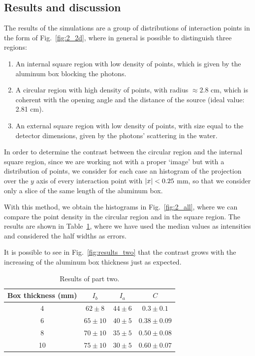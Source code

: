 \documentclass[a4paper]{article}
\begin{document}
\subsection{Results and discussion}
The results of the simulations are a group of distributions of interaction points in the form of Fig.~\ref{fig:2_2d}, where in general is possible to distinguish three regions:
\begin{enumerate}
  \item An internal square region with low density of points, which is given by the aluminum box blocking the photons.
  \item A circular region with high density of points, with radius $\approx 2.8$ cm, which is coherent with the opening angle and the distance of the source (ideal value: 2.81 cm).
  \item An external square region with low density of points, with size equal to the detector dimensions, given by the photons' scattering in the water.
\end{enumerate}
In order to determine the contrast between the circular region and the internal square region, since we are working not with a proper `image' but with a distribution of points, we consider for each case an histogram of the projection over the $y$ axis of every interaction point with $\abs{x} < 0.25$ mm, so that we consider only a slice of the same length of the aluminum box.

With this method, we obtain the histograms in Fig.~\ref{fig:2_all}, where we can compare the point density in the circular region and in the square region. The results are shown in Table~\ref{tab:part_two}, where we have used the median values as intensities and considered the half widths as errors.

It is possible to see in Fig.~\ref{fig:results_two} that the contrast grows with the increasing of the aluminum box thickness just as expected.

\begin{table}[!htb]
  \centering
  \begin{tabular}{|c|c|c|c|}
    \hline
    Box thickness (mm) & $I_{b}$ & $I_{a}$ & $C$ \\
    \hline
    4 & $62 \pm 8$ & $44 \pm 6$ & $0.3 \pm 0.1$\\
    \hline
    6 & $65 \pm 10$ & $40 \pm 5$ & $0.38 \pm 0.09$\\
    \hline
    8 & $70 \pm 10$ & $35 \pm 5$ & $0.50 \pm 0.08$ \\
    \hline
    10 & $75 \pm 10$ & $30 \pm 5$ & $0.60 \pm 0.07$\\
    \hline
  \end{tabular}
  \caption{Results of part two.}
  \label{tab:part_two}
\end{table}
\end{document}

